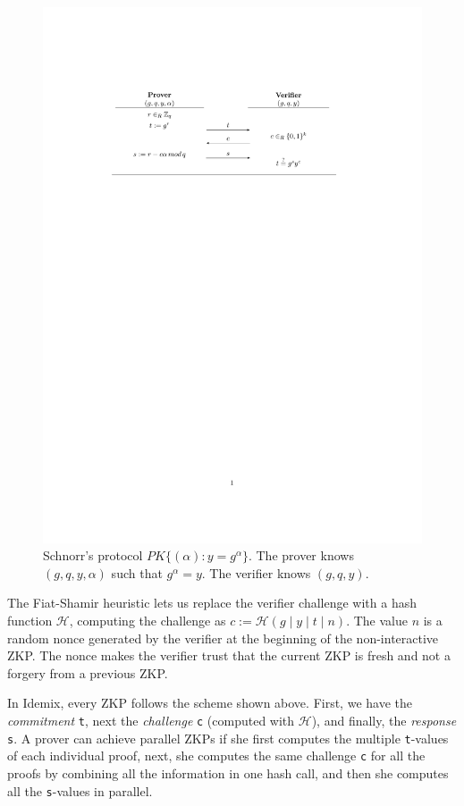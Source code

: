 \begin{figure}[bth]
	\includegraphics[width=\linewidth]{gfx/schnorr}
		\caption{Schnorr's protocol $PK\{ (\alpha) : y = g^\alpha \}$. The prover knows $(g,q,y,\alpha)$ such that $g^\alpha=y$. The verifier knows $(g,q,y)$.}
	\label{fig:schnorr}
\end{figure}

The Fiat-Shamir heuristic lets us replace the verifier challenge with a hash function $\mathcal{H}$, computing the challenge as $c:=\mathcal{H}(g\mid y\mid t\mid n)$. The value $n$ is a random nonce generated by the verifier at the beginning of the non-interactive ZKP. The nonce makes the verifier trust that the current ZKP is fresh and not a forgery from a previous ZKP.

In Idemix, every ZKP follows the scheme shown above. First, we have the \textit{commitment} \texttt{t}, next the \textit{challenge} \texttt{c} (computed with $\mathcal{H}$), and finally, the \textit{response} \texttt{s}. A prover can achieve parallel ZKPs if she first computes the multiple \texttt{t}-values of each individual proof, next, she computes the same challenge \texttt{c} for all the proofs by combining all the information in one hash call, and then she computes all the \texttt{s}-values in parallel.

